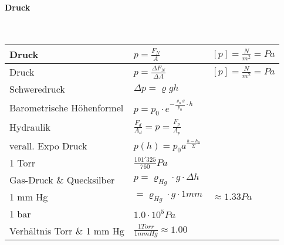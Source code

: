 \vspace{1mm}

\paragraph{Druck}\mbox{}\\
\noindent
\begin{tabularx}{\columnwidth}{@{}XXX@{}}
	Druck                      & $p = \frac{F_N}{A}$                                & $[p] = \frac{N}{m^2} = Pa$ \\ \hline
	Druck                      & $p = \frac{\Delta F_N}{\Delta A}$                  & $[p] = \frac{N}{m^2} = Pa$ \\ \hline
	Schweredruck               & $\Delta p = \varrho gh$                                                         \\ \hline
	Barometrische Höhenformel  & $p = p_0 \cdot e^{-\frac{\varrho_0g}{p_0}\cdot h}$                              \\ \hline
	Hydraulik                  & $\frac{F_d}{A_d} = p = \frac{F_p}{A_p}$                                         \\ \hline
	verall. Expo Druck         & $p(h) = p_0 a^{\frac{h-h_0}{\Sigma}}$                                           \\ \hline
	1 Torr                     & $\frac{101'325}{760} Pa$                                                        \\ \hline
	Gas-Druck \& Quecksilber   & $p = \varrho_{Hg} \cdot g \cdot \Delta h$                                       \\ \hline
	1 mm Hg                    & $= \varrho_{Hg} \cdot g \cdot 1mm$                 & $\approx 1.33 Pa$          \\ \hline
	1 bar                      & $1.0\cdot 10^5 Pa$                                                              \\ \hline
	Verhältnis Torr \& 1 mm Hg & $\frac{1 Torr}{1 mm Hg} \approx 1.00$                                           \\ \hline
\end{tabularx}


